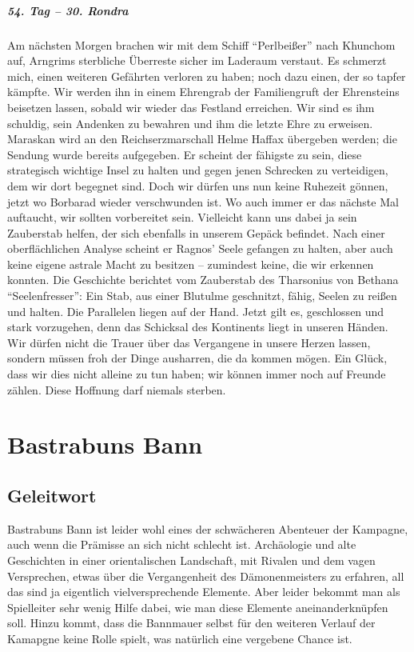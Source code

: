 \paragraph{54. Tag -- 30. Rondra}
Am nächsten Morgen brachen wir mit dem Schiff ``Perlbeißer'' nach Khunchom auf, Arngrims sterbliche Überreste sicher im Laderaum verstaut. Es schmerzt mich, einen weiteren Gefährten verloren zu haben; noch dazu einen, der so tapfer kämpfte. Wir werden ihn in einem Ehrengrab der Familiengruft der Ehrensteins beisetzen lassen, sobald wir wieder das Festland erreichen. Wir sind es ihm schuldig, sein Andenken zu bewahren und ihm die letzte Ehre zu erweisen. Maraskan wird an den Reichserzmarschall Helme Haffax übergeben werden; die Sendung wurde bereits aufgegeben. Er scheint der fähigste zu sein, diese strategisch wichtige Insel zu halten und gegen jenen Schrecken zu verteidigen, dem wir dort begegnet sind. Doch wir dürfen uns nun keine Ruhezeit gönnen, jetzt wo Borbarad wieder verschwunden ist. Wo auch immer er das nächste Mal auftaucht, wir sollten vorbereitet sein. Vielleicht kann uns dabei ja sein Zauberstab helfen, der sich ebenfalls in unserem Gepäck befindet. Nach einer oberflächlichen Analyse scheint er Ragnos' Seele gefangen zu halten, aber auch keine eigene astrale Macht zu besitzen -- zumindest keine, die wir erkennen konnten. Die Geschichte berichtet vom Zauberstab des Tharsonius von Bethana ``Seelenfresser'': Ein Stab, aus einer Blutulme geschnitzt, fähig, Seelen zu reißen und halten. Die Parallelen liegen auf der Hand. Jetzt gilt es, geschlossen und stark vorzugehen, denn das Schicksal des Kontinents liegt in unseren Händen. Wir dürfen nicht die Trauer über das Vergangene in unsere Herzen lassen, sondern müssen froh der Dinge ausharren, die da kommen mögen. Ein Glück, dass wir dies nicht alleine zu tun haben; wir können immer noch auf Freunde zählen. Diese Hoffnung darf niemals sterben.

\chapter{Bastrabuns Bann}

\section{Geleitwort}

Bastrabuns Bann ist leider wohl eines der schwächeren Abenteuer der Kampagne, auch wenn die Prämisse an sich nicht schlecht ist.
Archäologie und alte Geschichten in einer orientalischen Landschaft, mit Rivalen und dem vagen Versprechen, etwas über die Vergangenheit des Dämonenmeisters zu erfahren, all das sind ja eigentlich vielversprechende Elemente.
Aber leider bekommt man als Spielleiter sehr wenig Hilfe dabei, wie man diese Elemente aneinanderknüpfen soll.
Hinzu kommt, dass die Bannmauer selbst für den weiteren Verlauf der Kamapgne keine Rolle spielt, was natürlich eine vergebene Chance ist.

